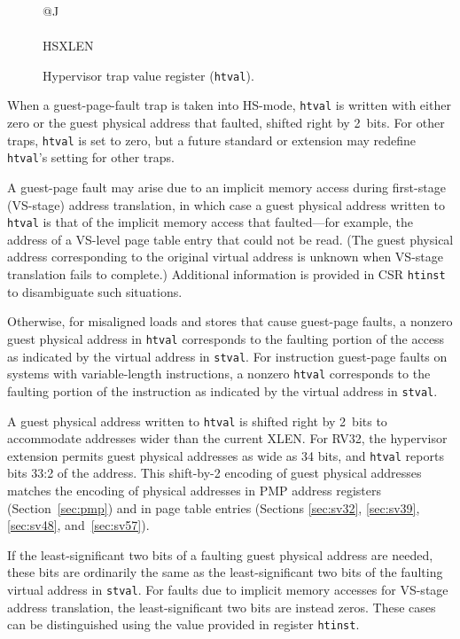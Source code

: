 \begin{figure*}[h!]
{\footnotesize
\begin{center}
\begin{tabular}{@{}J}
 \\
\hline
{} \\
\hline
HSXLEN \\
\end{tabular}
\end{center}
}
\vspace{-0.1in}
\caption{Hypervisor trap value register ({\tt htval}).}
\label{htvalreg}
\end{figure*}

When a guest-page-fault trap is taken into HS-mode, {\tt htval} is
written with either zero or the guest physical address that faulted,
shifted right by 2~bits.
For other traps, {\tt htval} is set to zero, but a future standard or
extension may redefine {\tt htval}'s setting for other traps.

A guest-page fault may arise due to an implicit memory access during
first-stage (VS-stage) address translation, in which case a guest
physical address written to {\tt htval} is that of the implicit memory
access that faulted---for example, the address of a VS-level page table
entry that could not be read.
(The guest physical address corresponding to the original virtual address
is unknown when VS-stage translation fails to complete.)
Additional information is provided in CSR {\tt htinst} to disambiguate
such situations.

Otherwise, for misaligned loads and stores that cause guest-page faults,
a nonzero guest physical address in {\tt htval} corresponds to the
faulting portion of the access as indicated by the virtual address in
{\tt stval}.
For instruction guest-page faults on systems with variable-length
instructions, a nonzero {\tt htval} corresponds to the faulting portion
of the instruction as indicated by the virtual address in {\tt stval}.

\begin{commentary}
A guest physical address written to {\tt htval} is shifted right by
2~bits to accommodate addresses wider than the current XLEN.
For RV32, the hypervisor extension permits guest physical addresses as
wide as 34 bits, and {\tt htval} reports bits 33:2 of the address.
This shift-by-2 encoding of guest physical addresses matches the encoding
of physical addresses in PMP address registers (Section~\ref{sec:pmp})
and in page table entries (Sections \ref{sec:sv32}, \ref{sec:sv39},
\ref{sec:sv48}, and~\ref{sec:sv57}).

If the least-significant two bits of a faulting guest physical address
are needed, these bits are ordinarily the same as the least-significant
two bits of the faulting virtual address in {\tt stval}.
For faults due to implicit memory accesses for VS-stage address
translation, the least-significant two bits are instead zeros.
These cases can be distinguished using the value provided in register
{\tt htinst}.
\end{commentary}

